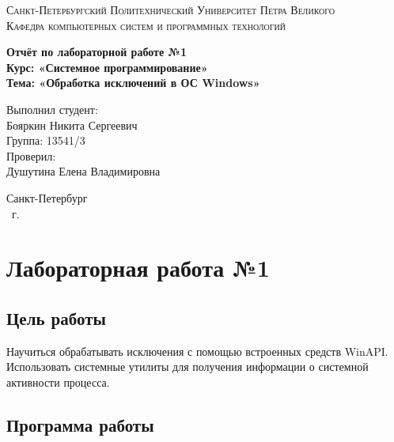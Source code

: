 \documentclass[14pt,a4paper,report]{report}
\begin{document}
\def\contentsname{Содержание}

\begin{titlepage}
	\begin{center}
		\textsc{Санкт-Петербургский Политехнический 
			Университет Петра Великого\\[5mm]
			Кафедра компьютерных систем и программных технологий}
		
		\vfill
		
		\textbf{Отчёт по лабораторной работе №1\\[3mm]
			Курс: «Системное программирование»\\[6mm]
			Тема: «Обработка исключений в ОС Windows»\\[35mm]
		}
	\end{center}
	
	\hfill
	\begin{minipage}{.4\textwidth}
		Выполнил студент:\\[2mm] 
		Бояркин Никита Сергеевич\\
		Группа: 13541/3\\[5mm]
		
		Проверил:\\[2mm] 
		Душутина Елена Владимировна
	\end{minipage}
	\vfill
	\begin{center}
		Санкт-Петербург\\ \the\year\ г.
	\end{center}
\end{titlepage}

\tableofcontents
\clearpage

\chapter{Лабораторная работа №1}

\section{Цель работы}

Научиться обрабатывать исключения с помощью встроенных средств WinAPI. Использовать системные утилиты для получения информации о системной активности процесса.

\section{Программа работы}
\end{document}
